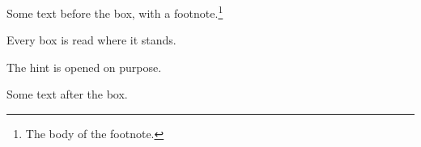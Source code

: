 Some text before the box, with a footnote.\footnote{The body of the footnote.}

\begin{theorem}
Every box is read where it stands.
\end{theorem}

\begin{webhint}
The hint is opened on purpose.
\end{webhint}

Some text after the box.
